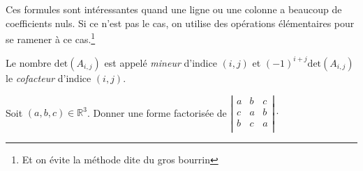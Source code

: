 \documentclass[a4paper,10pt]{report}
\begin{document}
\begin{rems} 
\item Ces formules sont intéressantes quand une ligne ou une colonne a beaucoup de coefficients nuls. Si ce n'est pas le cas, on utilise des opérations élémentaires pour se ramener à ce cas.\footnote{Et on évite la méthode dite \og du gros bourrin \fg }
\item Le nombre $\textrm{det}(A_{i,j})$ est appelé \textit{mineur} d'indice $(i,j)$ et $(-1)^{i+j}\textrm{det}(A_{i,j})$ le \textit{cofacteur} d'indice $(i,j)$.
\end{rems}


\begin{ex} Soit $(a,b,c) \in \mathbb{R}^3$. Donner une forme factorisée de $\left\vert \begin{array}{ccc}
a & b & c \\
c & a & b \\
b & c & a \\
\end{array} \right\vert \cdot$
%
%


\end{ex}
\end{document}
